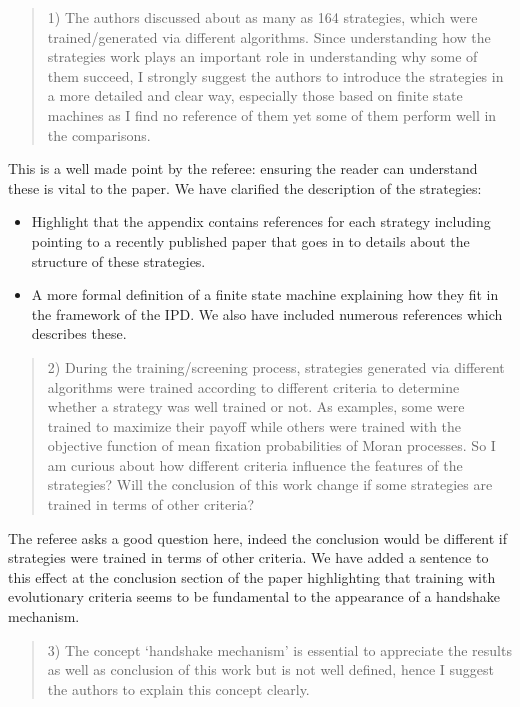 \documentclass[a4]{article}
\begin{document}
\begin{quote}
    1) The authors discussed about as many as 164 strategies, which were
    trained/generated via different algorithms. Since understanding how the
    strategies work plays an important role in understanding why some of them
    succeed, I strongly suggest the authors to introduce the strategies in a more
    detailed and clear way, especially those based on finite state machines as I
    find no reference of them yet some of them perform well in the comparisons.
\end{quote}

This is a well made point by the referee: ensuring the reader can understand
these is vital to the paper.
We have clarified the description of the strategies:

\begin{itemize}
    \item Highlight that the appendix contains references for each strategy
        including pointing to a recently published paper that goes in to details
        about the structure of these strategies.
    \item A more formal definition of a finite state machine explaining how they
        fit in the framework of the IPD. We also have included numerous references
        which describes these.
\end{itemize}

\begin{quote}
  2) During the training/screening process, strategies generated via different
  algorithms were trained according to different criteria to determine whether a
  strategy was well trained or not. As examples, some were trained to maximize
  their payoff while others were trained with the objective function of mean
  fixation probabilities of Moran processes. So I am curious about how different
  criteria influence the features of the strategies? Will the conclusion of this
  work change if some strategies are trained in terms of other criteria?
\end{quote}

The referee asks a good question here, indeed the conclusion would be different
if strategies were trained in terms of other criteria. We have added a sentence
to this effect at the conclusion section of the paper highlighting that training
with evolutionary criteria seems to be fundamental to the appearance of a
handshake mechanism.

\begin{quote}
  3) The concept `handshake mechanism' is essential to appreciate the results as
  well as conclusion of this work but is not well defined, hence I suggest the
  authors to explain this concept clearly.
\end{quote}
\end{document}
